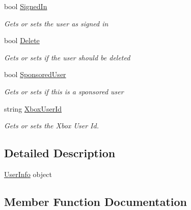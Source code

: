 \begin{DoxyCompactItemize}
bool \hyperlink{class_microsoft_1_1_tools_1_1_windows_device_portal_1_1_device_portal_1_1_user_info_abfc08ec51962a43b1e8566a93402d5e8}{Signed\+In}
\begin{DoxyCompactList}\small\item\em Gets or sets the user as signed in \end{DoxyCompactList}\item 
bool \hyperlink{class_microsoft_1_1_tools_1_1_windows_device_portal_1_1_device_portal_1_1_user_info_ac61608537be80b1d9a9305b7a1ac980f}{Delete}
\begin{DoxyCompactList}\small\item\em Gets or sets if the user should be deleted \end{DoxyCompactList}\item 
bool \hyperlink{class_microsoft_1_1_tools_1_1_windows_device_portal_1_1_device_portal_1_1_user_info_a093cfe8850309b8a2136e0eb5d3c1a02}{Sponsored\+User}
\begin{DoxyCompactList}\small\item\em Gets or sets if this is a sponsored user \end{DoxyCompactList}\item 
string \hyperlink{class_microsoft_1_1_tools_1_1_windows_device_portal_1_1_device_portal_1_1_user_info_a6544441b463329dfa493348f62746a95}{Xbox\+User\+Id}
\begin{DoxyCompactList}\small\item\em Gets or sets the Xbox User Id. \end{DoxyCompactList}\end{DoxyCompactItemize}


\subsection{Detailed Description}
\hyperlink{class_microsoft_1_1_tools_1_1_windows_device_portal_1_1_device_portal_1_1_user_info}{User\+Info} object 



\subsection{Member Function Documentation}
